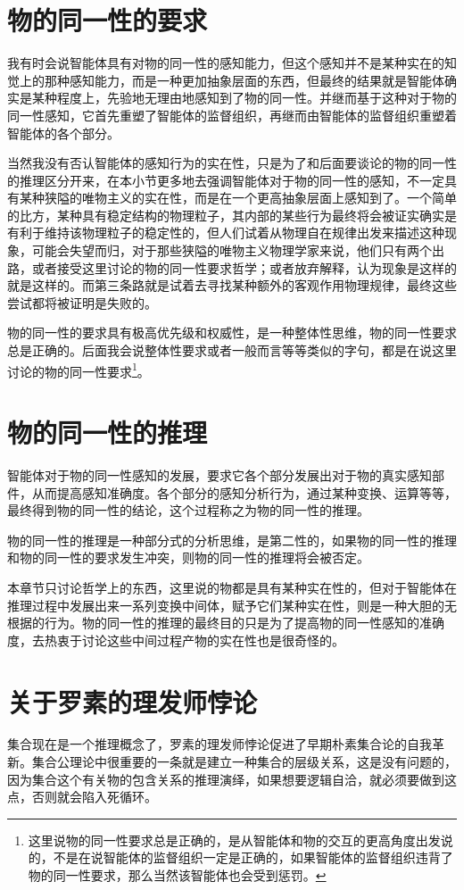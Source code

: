 \documentclass[12pt,oneside]{book}
\begin{document}
\section{物的同一性的要求}
我有时会说智能体具有对物的同一性的感知能力，但这个感知并不是某种实在的知觉上的那种感知能力，而是一种更加抽象层面的东西，但最终的结果就是智能体确实是某种程度上，先验地无理由地感知到了物的同一性。并继而基于这种对于物的同一性感知，它首先重塑了智能体的监督组织，再继而由智能体的监督组织重塑着智能体的各个部分。

当然我没有否认智能体的感知行为的实在性，只是为了和后面要谈论的物的同一性的推理区分开来，在本小节更多地去强调智能体对于物的同一性的感知，不一定具有某种狭隘的唯物主义的实在性，而是在一个更高抽象层面上感知到了。一个简单的比方，某种具有稳定结构的物理粒子，其内部的某些行为最终将会被证实确实是有利于维持该物理粒子的稳定性的，但人们试着从物理自在规律出发来描述这种现象，可能会失望而归，对于那些狭隘的唯物主义物理学家来说，他们只有两个出路，或者接受这里讨论的物的同一性要求哲学；或者放弃解释，认为现象是这样的就是这样的。而第三条路就是试着去寻找某种额外的客观作用物理规律，最终这些尝试都将被证明是失败的。

物的同一性的要求具有极高优先级和权威性，是一种整体性思维，物的同一性要求总是正确的。后面我会说整体性要求或者一般而言等等类似的字句，都是在说这里讨论的物的同一性要求\footnote{这里说物的同一性要求总是正确的，是从智能体和物的交互的更高角度出发说的，不是在说智能体的监督组织一定是正确的，如果智能体的监督组织违背了物的同一性要求，那么当然该智能体也会受到惩罚。}。


\section{物的同一性的推理}
智能体对于物的同一性感知的发展，要求它各个部分发展出对于物的真实感知部件，从而提高感知准确度。各个部分的感知分析行为，通过某种变换、运算等等，最终得到物的同一性的结论，这个过程称之为物的同一性的推理。

物的同一性的推理是一种部分式的分析思维，是第二性的，如果物的同一性的推理和物的同一性的要求发生冲突，则物的同一性的推理将会被否定。

本章节只讨论哲学上的东西，这里说的物都是具有某种实在性的，但对于智能体在推理过程中发展出来一系列变换中间体，赋予它们某种实在性，则是一种大胆的无根据的行为。物的同一性的推理的最终目的只是为了提高物的同一性感知的准确度，去热衷于讨论这些中间过程产物的实在性也是很奇怪的。

\section{关于罗素的理发师悖论}
集合现在是一个推理概念了，罗素的理发师悖论促进了早期朴素集合论的自我革新。集合公理论中很重要的一条就是建立一种集合的层级关系，这是没有问题的，因为集合这个有关物的包含关系的推理演绎，如果想要逻辑自洽，就必须要做到这点，否则就会陷入死循环。
\end{document}
